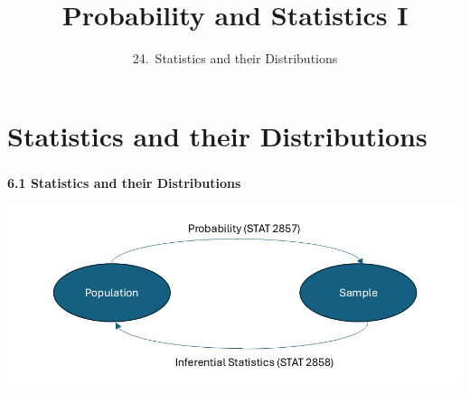 

\newcommand{\lecturenum}{24}

\title[SS2857]{Probability and Statistics I}
\subtitle{\lecturenum.~Statistics and their Distributions}

\date{}






{

\begin{frame}
  \addtocounter{framenumber}{-1}

  \maketitle
\end{frame}
}

\section{Statistics and their Distributions}

\begin{frame}
  \frametitle{}
  
  \begin{center}
    \Large{\textbf{6.1 Statistics and their Distributions}}

    \bigskip

  \end{center}
  
\end{frame}


\begin{frame}

  \begin{center}
    \includegraphics[height=.6\textheight]{statistics_vs_probability}
  \end{center}
\end{frame}

